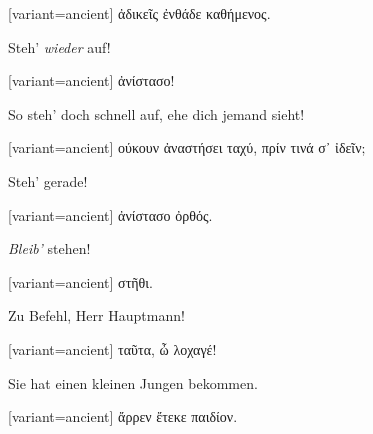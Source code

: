 \switchcolumn

\begin{greek}[variant=ancient]%
ἀδικεῖς ἐνθάδε καθήμενος.

\end{greek}%
\switchcolumn*

Steh' \emph{wieder} auf!

\switchcolumn

\begin{greek}[variant=ancient]%
ἀνίστασο!

\end{greek}%
\switchcolumn*

So steh' doch schnell auf, ehe dich jemand sieht!

\switchcolumn

\begin{greek}[variant=ancient]%
ούκουν ἀναστήσει ταχύ, πρίν τινά σ᾽ ἰδεῖν;

\end{greek}%
\switchcolumn*

Steh' gerade!

\switchcolumn

\begin{greek}[variant=ancient]%
ἀνίστασο ὀρθός.

\end{greek}%
\switchcolumn*

\emph{Bleib'} stehen!

\switchcolumn

\begin{greek}[variant=ancient]%
στῆθι.

\end{greek}%
\switchcolumn*

Zu Befehl, Herr Hauptmann!

\switchcolumn

\begin{greek}[variant=ancient]%
ταῦτα, ὦ λοχαγέ!

\end{greek}%
Sie hat einen kleinen Jungen bekommen.

\switchcolumn

\begin{greek}[variant=ancient]%
ἄρρεν ἔτεκε παιδίον.

\end{greek}%
\switchcolumn*

